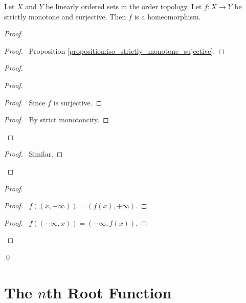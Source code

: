 \begin{proposition}
    \label{proposition:homeomorphism_order_topology}
    Let $X$ and $Y$ be linearly ordered sets in the order topology. Let $f : X \rightarrow Y$ be strictly monotone and surjective. Then $f$ is a homeomorphism.
\end{proposition}

\begin{proof}
    \pf
    \begin{proof}
        \pf\ Proposition \ref{proposition:iso_strictly_monotone_sujective}.
    \end{proof}
    \begin{proof}
        \begin{proof}
            \begin{proof}
                \pf\ Since $f$ is surjective.
            \end{proof}
            \begin{proof}
                \pf\ By strict monotoncity.
            \end{proof}
        \end{proof}
        \begin{proof}
            \pf\ Similar.
        \end{proof}
    \end{proof}
    \begin{proof}
        \begin{proof}
            \pf\ $f((x, +\infty)) = (f(x), +\infty)$.
        \end{proof}
        \begin{proof}
            \pf\ $f((-\infty, x)) = (-\infty, f(x))$.
        \end{proof}
    \end{proof}
    \qed
\end{proof}

\section{The $n$th Root Function}

